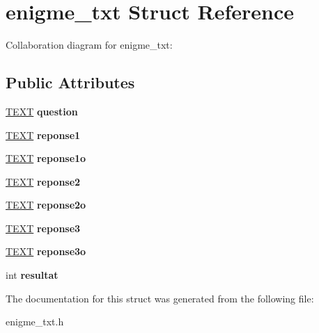 \hypertarget{structenigme__txt}{}\section{enigme\+\_\+txt Struct Reference}
\label{structenigme__txt}


Collaboration diagram for enigme\+\_\+txt\+:
\subsection*{Public Attributes}
\begin{DoxyCompactItemize}
\item 
\mbox{\label{structenigme__txt_a22289c4253b7c647c7aca30a6daf8752}} 
\hyperlink{structTEXT}{T\+E\+XT} {\bfseries question}
\item 
\mbox{\label{structenigme__txt_a4836657be4c4f9b5823f2d33dd96ce2c}} 
\hyperlink{structTEXT}{T\+E\+XT} {\bfseries reponse1}
\item 
\mbox{\label{structenigme__txt_aeb8be8c82d565ee2b2a39b3c9d75cd70}} 
\hyperlink{structTEXT}{T\+E\+XT} {\bfseries reponse1o}
\item 
\mbox{\label{structenigme__txt_a78ae53f3e65ace9cb9f99497ecb20431}} 
\hyperlink{structTEXT}{T\+E\+XT} {\bfseries reponse2}
\item 
\mbox{\label{structenigme__txt_a227912737703da2d4d71e608714565d4}} 
\hyperlink{structTEXT}{T\+E\+XT} {\bfseries reponse2o}
\item 
\mbox{\label{structenigme__txt_adabb4fdab4a20bf2cf3892ffcd3dab6a}} 
\hyperlink{structTEXT}{T\+E\+XT} {\bfseries reponse3}
\item 
\mbox{\label{structenigme__txt_a15cd2cb136b7c6c4736d353f189d2164}} 
\hyperlink{structTEXT}{T\+E\+XT} {\bfseries reponse3o}
\item 
\mbox{\label{structenigme__txt_a51661724dc2a26231ddb5683c0cdc6bc}} 
int {\bfseries resultat}
\end{DoxyCompactItemize}


The documentation for this struct was generated from the following file\+:\begin{DoxyCompactItemize}
\item 
enigme\+\_\+txt.\+h\end{DoxyCompactItemize}
